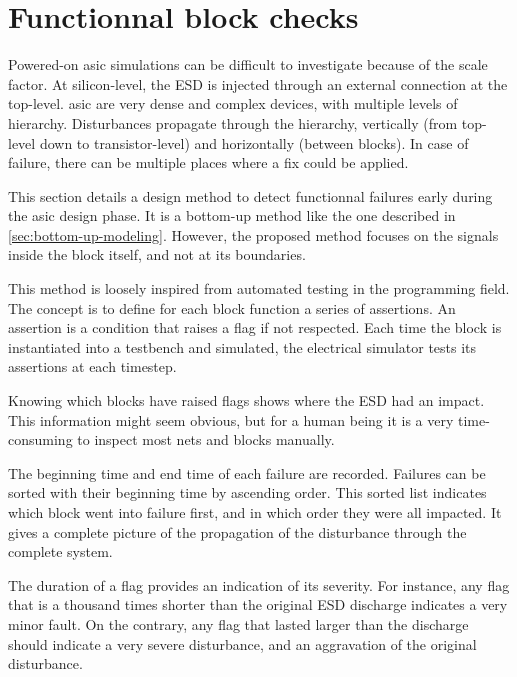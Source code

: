 \section{Functionnal block checks}

Powered-on \gls{asic} simulations can be difficult to investigate because of the scale factor.
At silicon-level, the ESD is injected through an external connection at the top-level.
\gls{asic} are very dense and complex devices, with multiple levels of hierarchy.
Disturbances propagate through the hierarchy, vertically (from top-level down to transistor-level) and horizontally (between blocks).
In case of failure, there can be multiple places where a fix could be applied.

This section details a design method to detect functionnal failures early during the \gls{asic} design phase.
It is a bottom-up method like the one described in \ref{sec:bottom-up-modeling}.
However, the proposed method focuses on the signals inside the block itself, and not at its boundaries.

This method is loosely inspired from automated testing in the programming field.
The concept is to define for each block function a series of assertions.
An assertion is a condition that raises a flag if not respected.
Each time the block is instantiated into a testbench and simulated, the electrical simulator tests its assertions at each timestep.

Knowing which blocks have raised flags shows where the ESD had an impact.
This information might seem obvious, but for a human being it is a very time-consuming to inspect most nets and blocks manually.

The beginning time and end time of each failure are recorded.
Failures can be sorted with their beginning time by ascending order.
This sorted list indicates which block went into failure first, and in which order they were all impacted.
It gives a complete picture of the propagation of the disturbance through the complete system.

The duration of a flag provides an indication of its severity.
For instance, any flag that is a thousand times shorter than the original \gls{ESD} discharge indicates a very minor fault.
On the contrary, any flag that lasted larger than the discharge should indicate a very severe disturbance, and an aggravation of the original disturbance.

